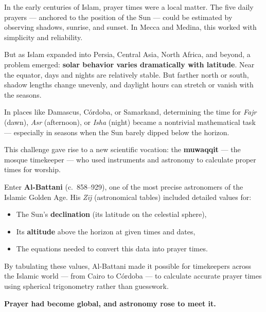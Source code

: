 \begin{tcolorbox}[colback=gray!5!white, colframe=black, title=\textbf{Historical Sidebar: When Prayer Became a Global Problem}, fonttitle=\bfseries, arc=1.5mm, boxrule=0.4pt]

    In the early centuries of Islam, prayer times were a local matter. The five daily prayers — anchored to the position of the Sun — could be estimated by observing shadows, sunrise, and sunset. In Mecca and Medina, this worked with simplicity and reliability.
    
    But as Islam expanded into Persia, Central Asia, North Africa, and beyond, a problem emerged: \textbf{solar behavior varies dramatically with latitude}. Near the equator, days and nights are relatively stable. But farther north or south, shadow lengths change unevenly, and daylight hours can stretch or vanish with the seasons.
    
    \medskip
    
    In places like Damascus, Córdoba, or Samarkand, determining the time for \textit{Fajr} (dawn), \textit{Asr} (afternoon), or \textit{Isha} (night) became a nontrivial mathematical task — especially in seasons when the Sun barely dipped below the horizon.
    
    \medskip
    
    This challenge gave rise to a new scientific vocation: the \textbf{muwaqqit} — the mosque timekeeper — who used instruments and astronomy to calculate proper times for worship.
    
    \medskip
    
    Enter \textbf{Al-Battani} (c.~858–929), one of the most precise astronomers of the Islamic Golden Age. His \textit{Zīj} (astronomical tables) included detailed values for:
    \begin{itemize}
      \item The Sun’s \textbf{declination} (its latitude on the celestial sphere),
      \item Its \textbf{altitude} above the horizon at given times and dates,
      \item The equations needed to convert this data into prayer times.
    \end{itemize}
    
    \medskip
    
    By tabulating these values, Al-Battani made it possible for timekeepers across the Islamic world — from Cairo to Córdoba — to calculate accurate prayer times using spherical trigonometry rather than guesswork.
    
    \medskip
    
    \textbf{Prayer had become global, and astronomy rose to meet it.}
    
\end{tcolorbox}







